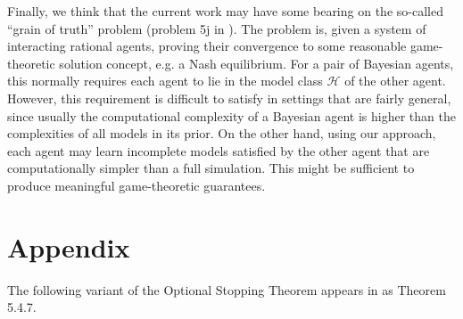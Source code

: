 \documentclass[11pt]{article}
\theoremstyle{definition}
\theoremstyle{plain}
\newcommand{\MC}{\mathcal{H}}
\begin{document}
Finally, we think that the current work may have some bearing on the so-called \enquote{grain of truth} problem (problem 5j in \cite{Hutter_2009}). The problem is, given a system of interacting rational agents, proving their convergence to some reasonable game-theoretic solution concept, e.g. a Nash equilibrium. For a pair of Bayesian agents, this normally requires each agent to lie in the model class $\MC$ of the other agent. However, this requirement is difficult to satisfy in settings that are fairly general, since usually the computational complexity of a Bayesian agent is higher than the complexities of all models in its prior. On the other hand, using our approach, each agent may learn incomplete models satisfied by the other agent that are computationally simpler than a full simulation. This might be sufficient to produce meaningful game-theoretic guarantees.

\appendix

\section{Appendix}

The following variant of the Optional Stopping Theorem appears in \cite{Durrett_2010} as Theorem 5.4.7.
\end{document}
